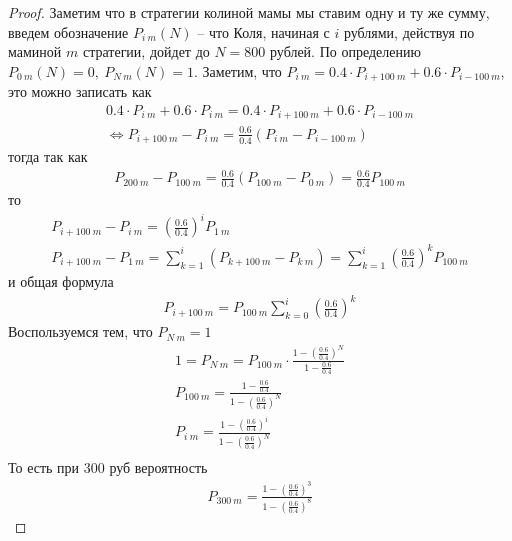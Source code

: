     \begin{prob}
    \end{prob}
    \begin{proof}
        Заметим что в стратегии колиной мамы мы ставим одну и ту же сумму, введем обозначение $P_{i\ m}(N)$ -- что Коля, начиная с $i$ рублями, действуя по маминой $m$ стратегии, дойдет до $N = 800$ рублей. По определению $P_{0\ m}(N) = 0,\ P_{N\ m}(N) = 1$. Заметим, что $P_{i\ m} = 0.4 \cdot P_{i+100\ m} + 0.6 \cdot P_{i-100\ m}$, это можно записать как
        \begin{gather*}
            0.4 \cdot P_{i\ m} + 0.6 \cdot P_{i\ m} = 0.4 \cdot P_{i+100\ m} + 0.6 \cdot P_{i-100\ m}\\
            \Leftrightarrow P_{i+100\ m} - P_{i\ m} = \frac{0.6}{0.4}(P_{i\ m} - P_{i-100\ m})
        \end{gather*}
        тогда так как
        \begin{gather*}
            P_{200\ m} - P_{100\ m} = \frac{0.6}{0.4}(P_{100\ m} - P_{0\ m}) = \frac{0.6}{0.4} P_{100\ m}
        \end{gather*}
        то
        \begin{gather*}
            P_{i+100\ m} - P_{i\ m}
            = \left(\frac{0.6}{0.4}\right)^i P_{1\ m}\\
            P_{i+100\ m} - P_{1\ m}
            = \sum\limits_{k=1}^{i} (P_{k+100\ m} - P_{k\ m})
            = \sum\limits_{k=1}^{i} \left(\frac{0.6}{0.4}\right)^k P_{100\ m}
        \end{gather*}
        и общая формула
        \begin{gather*}
            P_{i+100\ m} = P_{100\ m} \sum\limits_{k=0}^{i} \left(\frac{0.6}{0.4}\right)^k
        \end{gather*}
        Воспользуемся тем, что $P_{N\ m} = 1$
        \begin{gather*}
            1 = P_{N\ m} = P_{100\ m} \cdot \frac{1 - \left(\frac{0.6}{0.4}\right)^{N}}{1 - \frac{0.6}{0.4}}\\
            P_{100\ m} = \frac{1 - \frac{0.6}{0.4}}{1 - \left(\frac{0.6}{0.4}\right)^{N}}\\
            P_{i\ m} = \frac{1 - \left(\frac{0.6}{0.4}\right)^{i}}{1 - \left(\frac{0.6}{0.4}\right)^{N}}\\
        \end{gather*}
        То есть при 300 руб вероятность
        \begin{gather*}
            P_{300\ m} = \frac{1 - \left(\frac{0.6}{0.4}\right)^{3}}{1 - \left(\frac{0.6}{0.4}\right)^{8}}

\end{gather*}
\end{proof}
